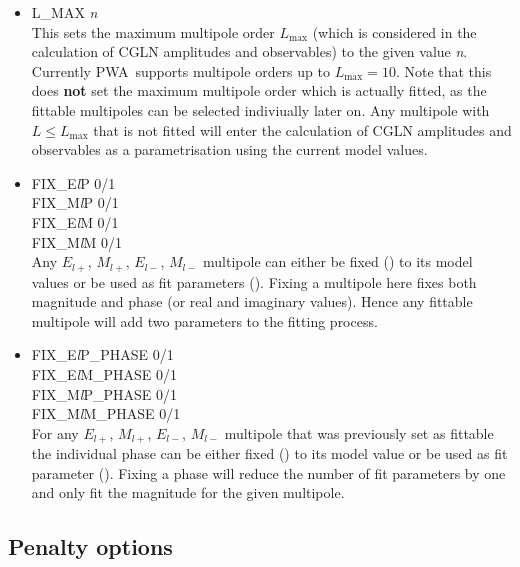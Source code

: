 \documentclass[a4paper,10pt]{article}
\def\PWA{\ttfamily PWA\rmfamily\ }
\def\tt{\ttfamily}
\def\rm{\rmfamily}
\begin{document}
\begin{itemize}
\item
\tt L\_MAX \textit{n}\rm\\
This sets the maximum multipole order $L_\mathrm{max}$ (which is considered in the calculation of CGLN amplitudes and observables)
to the given value \tt\textit{n}\rm. Currently \PWA supports multipole orders up to $L_\mathrm{max} = 10$. 
Note that this does \textbf{not} set the maximum multipole order which is actually fitted, as the fittable multipoles
can be selected indiviually later on. Any multipole with $L \leq L_\mathrm{max}$ that is not fitted will enter
the calculation of CGLN amplitudes and observables as a parametrisation using the current model values.

\item
\tt FIX\_E\textit{l}P 0/1\rm\\
\tt FIX\_M\textit{l}P 0/1\rm\\
\tt FIX\_E\textit{l}M 0/1\rm\\
\tt FIX\_M\textit{l}M 0/1\rm\\
Any $E_{l+}$, $M_{l+}$, $E_{l-}$, $M_{l-}$ multipole can either be fixed (\tt1\rm) to its model values
or be used as fit parameters (\tt0\rm).
Fixing a multipole here fixes both magnitude and phase (or real and imaginary values).
Hence any fittable multipole will add two parameters to the fitting process.

\item
\tt FIX\_E\textit{l}P\_PHASE 0/1\rm\\
\tt FIX\_E\textit{l}M\_PHASE 0/1\rm\\
\tt FIX\_M\textit{l}P\_PHASE 0/1\rm\\
\tt FIX\_M\textit{l}M\_PHASE 0/1\rm\\
For any $E_{l+}$, $M_{l+}$, $E_{l-}$, $M_{l-}$ multipole that was previously set as fittable the individual
phase can be either fixed (\tt1\rm) to its model value or be used as fit parameter (\tt0\rm). Fixing a phase
will reduce the number of fit parameters by one and only fit the magnitude for the given multipole.

\end{itemize}

\subsection{Penalty options}
\end{document}
